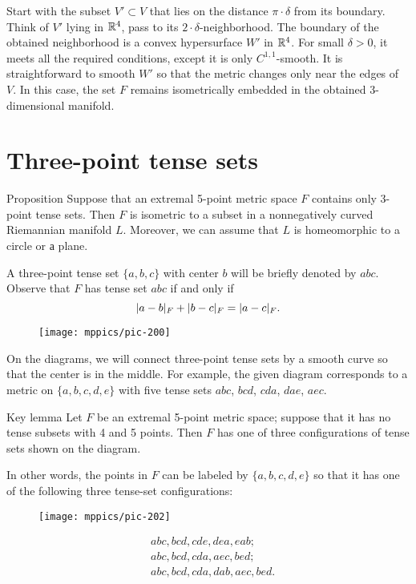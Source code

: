 \documentclass{article}
\begin{document}
Start with the subset $V'\subset V$ that lies on the distance $\pi\cdot\delta$ from its boundary.
Think of $V'$ lying in $\mathbb{R}^4$, pass to its $2\cdot \delta$-neighborhood.
The boundary of the obtained neighborhood is a convex hypersurface $W'$ in $\mathbb{R}^4$.
For small $\delta>0$, it meets all the required conditions, except it is only $C^{1,1}$-smooth.
It is straightforward to smooth $W'$ so that the metric changes only near the edges of~$V$.
In this case, the set $F$ remains isometrically embedded in the obtained 3-dimensional manifold.
\qeds


\section{Three-point tense sets}\label{sec:3-tense}

\begin{thm}{Proposition}\label{prop:3-tense}
Suppose that an extremal 5-point metric space $F$ contains only 3-point tense sets.
Then $F$ is isometric to a subset in a nonnegatively curved Riemannian manifold $L$.
Moreover, we can assume that $L$ is homeomorphic to a circle or а plane.
\end{thm}

A three-point tense set $\{a,b,c\}$ with center $b$ will be briefly denoted by $abc$.
Observe that $F$ has tense set $abc$ if and only if 
\[|a-b|_F+|b-c|_F\z=|a-c|_F.\]

{

\begin{wrapfigure}{r}{20mm}
\vskip-6mm
\centering
\texttt{[image: mppics/pic-200]}
\end{wrapfigure}

On the diagrams, we will connect three-point tense sets by a smooth curve so that the center is in the middle.
For example, the given diagram corresponds to a metric on $\{a,b,c,d,e\}$ with five tense sets $abc$, $bcd$, $cda$, $dae$, $aec$.

}

\begin{thm}{Key lemma}\label{lem:key}
Let $F$ be an extremal 5-point metric space; suppose that it has no tense subsets with 4 and 5 points.
Then $F$ has one of three configurations of tense sets shown on the diagram.

In other words, the points in $F$ can be labeled by $\{a,b,c,d,e\}$ so that it has
one of the following three tense-set configurations:

\begin{wrapfigure}{r}{50mm}
\vskip3mm
\centering
\texttt{[image: mppics/pic-202]}
\end{wrapfigure}
\vskip-6mm
\begin{align*}
&abc, bcd, cde, dea, eab;
\\
&abc, bcd, cda, aec, bed;
\\
&abc, bcd, cda, dab, aec, bed.
\end{align*}

\end{thm}
\end{document}
